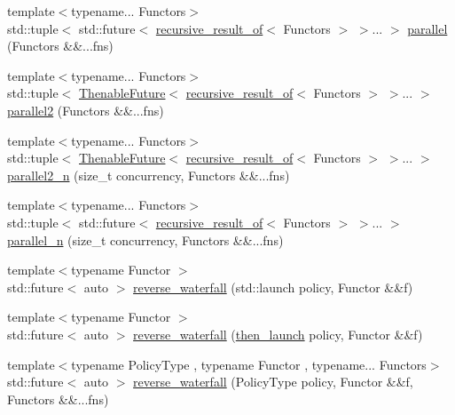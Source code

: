 \begin{DoxyCompactItemize}
{\footnotesize template$<$typename... Functors$>$ }\\std\+::tuple$<$ std\+::future$<$ \hyperlink{namespacethenable_ae5c96f83512d34d52e355cacdec0eb02}{recursive\+\_\+result\+\_\+of}$<$ Functors $>$ $>$... $>$ \hyperlink{namespacethenable_a95e108dc8790ef2db88424ea3ae46c79}{parallel} (Functors \&\&...fns)
\item 
{\footnotesize template$<$typename... Functors$>$ }\\std\+::tuple$<$ \hyperlink{classthenable_1_1_thenable_future}{Thenable\+Future}$<$ \hyperlink{namespacethenable_ae5c96f83512d34d52e355cacdec0eb02}{recursive\+\_\+result\+\_\+of}$<$ Functors $>$ $>$... $>$ \hyperlink{namespacethenable_a4619a50a59383db8a890cc02d8e44262}{parallel2} (Functors \&\&...fns)
\item 
{\footnotesize template$<$typename... Functors$>$ }\\std\+::tuple$<$ \hyperlink{classthenable_1_1_thenable_future}{Thenable\+Future}$<$ \hyperlink{namespacethenable_ae5c96f83512d34d52e355cacdec0eb02}{recursive\+\_\+result\+\_\+of}$<$ Functors $>$ $>$... $>$ \hyperlink{namespacethenable_ae386feb6dd2b3b1171a9f40f25b57f22}{parallel2\+\_\+n} (size\+\_\+t concurrency, Functors \&\&...fns)
\item 
{\footnotesize template$<$typename... Functors$>$ }\\std\+::tuple$<$ std\+::future$<$ \hyperlink{namespacethenable_ae5c96f83512d34d52e355cacdec0eb02}{recursive\+\_\+result\+\_\+of}$<$ Functors $>$ $>$... $>$ \hyperlink{namespacethenable_ae08454ef27fbe2ce5a3f6b2b008a0bc2}{parallel\+\_\+n} (size\+\_\+t concurrency, Functors \&\&...fns)
\item 
{\footnotesize template$<$typename Functor $>$ }\\std\+::future$<$ auto $>$ \hyperlink{namespacethenable_a18d5736181b78751445202e0c8b15a89}{reverse\+\_\+waterfall} (std\+::launch policy, Functor \&\&f)
\item 
{\footnotesize template$<$typename Functor $>$ }\\std\+::future$<$ auto $>$ \hyperlink{namespacethenable_af79aec5683931fe9e0fd77ff6f70ef0a}{reverse\+\_\+waterfall} (\hyperlink{namespacethenable_adf31291b806157ad914943dae5b3c94e}{then\+\_\+launch} policy, Functor \&\&f)
\item 
{\footnotesize template$<$typename Policy\+Type , typename Functor , typename... Functors$>$ }\\std\+::future$<$ auto $>$ \hyperlink{namespacethenable_ae89686b48dae0d225b8f942d49e9bb80}{reverse\+\_\+waterfall} (Policy\+Type policy, Functor \&\&f, Functors \&\&...fns)

\end{DoxyCompactItemize}

